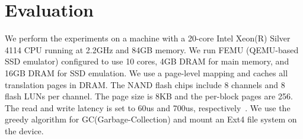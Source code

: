 \section{Evaluation}
We perform the experiments on a machine with a 20-core Intel Xeon(R) Silver
4114 CPU running at 2.2GHz and 84GB memory. We run FEMU (QEMU-based SSD
emulator) configured to use 10 cores, 4GB DRAM for main memory, and 16GB DRAM
for SSD emulation. We use a page-level mapping and caches all translation pages in DRAM. 
The NAND flash chips include 8 channels and 8 flash
LUNs per channel. The page size is 8KB and the per-block pages are 256. The
read and write latency is set to 60us and 700us,
respectively~\cite{cheong2018flash}. We use the greedy algorithm for
GC(Garbage-Collection) and mount an Ext4 file system on the device.

